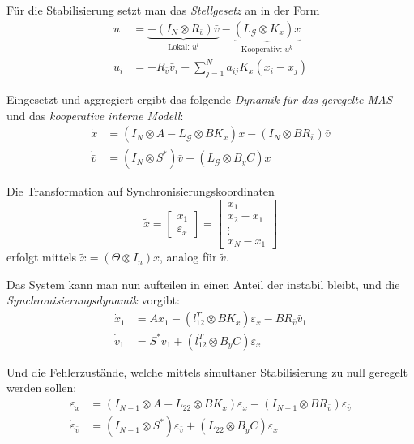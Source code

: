 Für die Stabilisierung setzt man das \emph{Stellgesetz} an in der Form
\begin{align}
    u&=\underbrace{-(I_N \otimes R_{\bar{v}})\bar{v}}_{\text{Lokal: }u^l} - \underbrace{(L_{\mathcal{G}} \otimes K_x)x}_{\text{Kooperativ: }u^k} \\
    u_i &= -R_{\bar{v}} \bar{v}_i - \sum_{j=1}^N a_{ij}K_x (x_i -x_j)
\end{align}

Eingesetzt und aggregiert ergibt das folgende \emph{Dynamik für das geregelte MAS} und das
\emph{kooperative interne Modell}:
\begin{align}
    \dot{x} &= (I_N \otimes A - L_{\mathcal{G}} \otimes BK_x) x - (I_N \otimes BR_{\bar{v}})\bar{v} \\
    \dot{\bar{v}} &= (I_N \otimes S^*)\bar{v} + (L_{\mathcal{G}}\otimes B_y C)x
\end{align}

Die Transformation auf Synchronisierungskoordinaten
\begin{equation}
    \tilde{x}=\begin{bmatrix}
        x_1 \\
        \varepsilon_x
    \end{bmatrix}
    = \begin{bmatrix}
        x_1 \\ x_2-x_1 \\ \vdots \\ x_N-x_1
    \end{bmatrix}
\end{equation}
erfolgt mittels $\tilde{x}=(\Theta \otimes I_n)x$, analog für $\tilde{v}$.


Das System kann man nun aufteilen in einen Anteil der instabil bleibt, und die
\emph{Synchronisierungsdynamik} vorgibt:
\begin{align}
    \dot{x}_1 &= Ax_1 - (l_{12}^T \otimes BK_x)\varepsilon_x - BR_{\bar{v}}\bar{v}_1 \\
    \dot{\bar{v}}_1 &= S^*\bar{v}_1 + (l_{12}^T \otimes B_y C)\varepsilon_x
\end{align}

Und die Fehlerzustände, welche mittels simultaner Stabilisierung
zu null geregelt werden sollen:
\begin{align}
    \dot{\varepsilon}_x &= (I_{N-1} \otimes A - L_{22} \otimes BK_x) \varepsilon_x - (I_{N-1} \otimes BR_{\bar{v}}) \varepsilon_{\bar{v}} \\
    \dot{\varepsilon}_{\bar{v}} &= (I_{N-1} \otimes S^*) \varepsilon_{\bar{v}} + (L_{22} \otimes B_y C) \varepsilon_x
\end{align}

